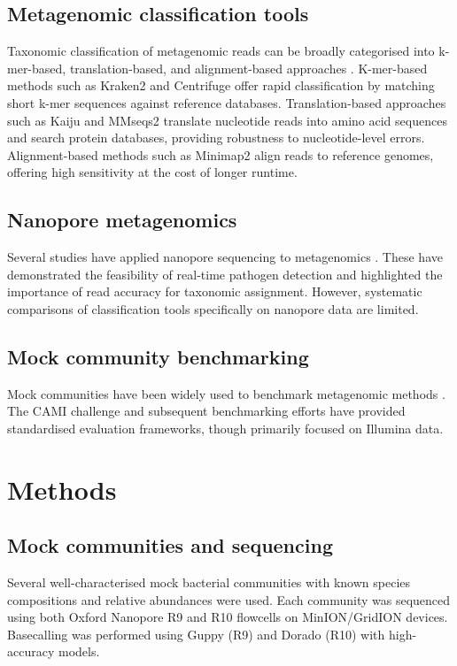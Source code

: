 \documentclass[11pt]{article}
\begin{document}
\subsection{Metagenomic classification tools}
Taxonomic classification of metagenomic reads can be broadly categorised into k-mer-based, translation-based, and alignment-based approaches \citep{breitwieser2019}. K-mer-based methods such as Kraken2 \citep{wood2019} and Centrifuge \citep{kim2016} offer rapid classification by matching short k-mer sequences against reference databases. Translation-based approaches such as Kaiju \citep{menzel2016} and MMseqs2 \citep{steinegger2017} translate nucleotide reads into amino acid sequences and search protein databases, providing robustness to nucleotide-level errors. Alignment-based methods such as Minimap2 \citep{li2018} align reads to reference genomes, offering high sensitivity at the cost of longer runtime.

\subsection{Nanopore metagenomics}
Several studies have applied nanopore sequencing to metagenomics \citep{sanderson2023,samarakoon2020,urban2021}. These have demonstrated the feasibility of real-time pathogen detection and highlighted the importance of read accuracy for taxonomic assignment. However, systematic comparisons of classification tools specifically on nanopore data are limited.

\subsection{Mock community benchmarking}
Mock communities have been widely used to benchmark metagenomic methods \citep{bokulich2013,nicholls2019,sczyrba2017}. The CAMI challenge \citep{sczyrba2017} and subsequent benchmarking efforts \citep{meyer2022,sun2021} have provided standardised evaluation frameworks, though primarily focused on Illumina data.

\section{Methods}

\subsection{Mock communities and sequencing}
Several well-characterised mock bacterial communities with known species compositions and relative abundances were used. Each community was sequenced using both Oxford Nanopore R9 and R10 flowcells on MinION/GridION devices. Basecalling was performed using Guppy (R9) and Dorado (R10) with high-accuracy models.
\end{document}
